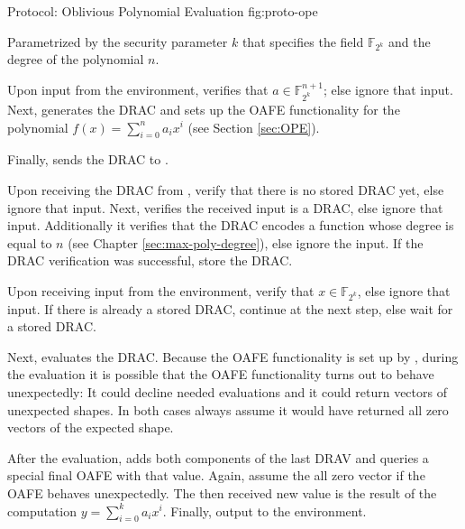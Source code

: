 \begin{JWprotocol}%
  {\JWprotoSymOPE}%
  {Protocol: Oblivious Polynomial Evaluation}%
  {fig:proto-ope}

  Parametrized by the security parameter $k$ that specifies the field
  $\mathbb{F}_{2^k}$ and the degree of the polynomial $n$.


  \begin{JWprotoSteps}

  \item Upon input  from the environment, \JWpOne{}
    verifies that $a \in \mathbb{F}_{2^k}^{n+1}$; else ignore that input. Next,
    \JWpOne{} generates the DRAC and sets up the OAFE functionality for the
    polynomial $f(x) = \sum_{i=0}^n a_ix^i$ (see Section \ref{sec:OPE}).

  \item Finally, \JWpOne{} sends the DRAC to \JWpTwo{}.

  \end{JWprotoSteps}



  \begin{JWprotoSteps}

  \item Upon receiving the DRAC from \JWpOne{}, verify that there is no stored
    DRAC yet, else ignore that input. Next, \JWpTwo{} verifies the received
    input is a DRAC, else ignore that input. Additionally it verifies
    that the DRAC encodes a function whose degree is equal to $n$ (see
    Chapter \ref{sec:max-poly-degree}), else ignore the input. If the DRAC
    verification was successful, store the DRAC.

  \item Upon receiving input  from the environment,
    verify that $x \in \mathbb{F}_{2^k}$, else ignore that input. If there is
    already a stored DRAC, continue at the next step, else wait for a stored
    DRAC.

  \item Next, \JWpTwo{} evaluates the DRAC. Because the OAFE functionality is
    set up by \JWpOne{}, during the evaluation it is possible that the OAFE
    functionality turns out to behave unexpectedly: It could decline needed
    evaluations and it could return vectors of unexpected shapes. In both cases
    always assume it would have returned all zero vectors of the expected shape.

  \item After the evaluation, \JWpTwo{} adds both components of the last DRAV
    and queries a special final OAFE with that value. Again, assume the all zero
    vector if the OAFE behaves unexpectedly. The then received new value is the
    result of the computation $y = \sum_{i=0}^k a_ix^i$. Finally, output
     to the environment.

  \end{JWprotoSteps}

\end{JWprotocol}

